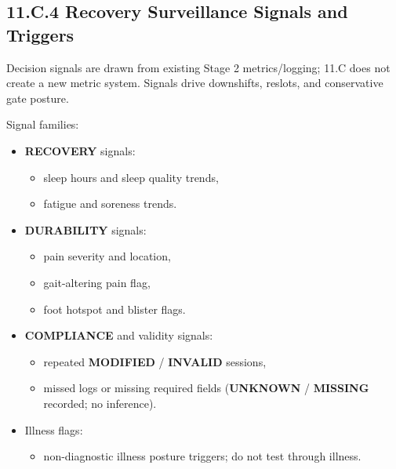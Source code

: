 \documentclass[10pt]{article}
\begin{document}
\newpage
    
\subsection*{11.C.4 Recovery Surveillance Signals and Triggers}
{}

Decision signals are drawn from existing Stage 2 metrics/logging; 11.C does not create a new metric system. Signals drive downshifts, reslots, and conservative gate posture.

Signal families:

\begin{itemize}
\item \textbf{RECOVERY} signals:
\begin{itemize}
\item sleep hours and sleep quality trends,
\item fatigue and soreness trends.
\end{itemize}
\item \textbf{DURABILITY} signals:
\begin{itemize}
\item pain severity and location,
\item gait-altering pain flag,
\item foot hotspot and blister flags.
\end{itemize}
\item \textbf{COMPLIANCE} and validity signals:
\begin{itemize}
\item repeated \textbf{MODIFIED} / \textbf{INVALID} sessions,
\item missed logs or missing required fields (\textbf{UNKNOWN} / \textbf{MISSING} recorded; no inference).
\end{itemize}
\item Illness flags:
\begin{itemize}
\item non-diagnostic illness posture triggers; do not test through illness.
\end{itemize}
\end{itemize}

\begingroup
\scriptsize
\setlength{\tabcolsep}{2pt}
\renewcommand{\arraystretch}{1.12}
\end{document}
